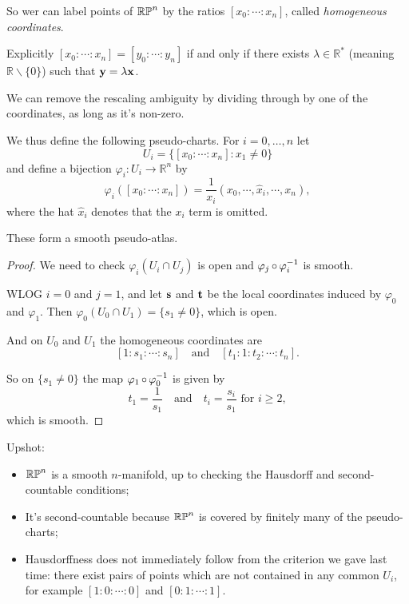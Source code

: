 \documentclass[a4paper,11pt]{article}
\begin{document}
	So wer can label points of $\mathbb{RP}^{n}$ by the ratios $[x_0 : \cdots : x_n]$, called \emph{homogeneous coordinates}.

	Explicitly $[x_0 : \cdots : x_n] = [y_0 : \cdots : y_n]$ if and only if there exists $\lambda \in \mathbb{R}^*$ (meaning $\mathbb{R} \backslash \{0\}$) such that $\vb y = \lambda \vb x$.

	We can remove the rescaling ambiguity by dividing through by one of the coordinates, as long as it's non-zero.

	We thus define the following pseudo-charts. For $i = 0, \dots, n$ let 
	\[
		U_i = \{[x_0 : \cdots : x_n] : x_1 \neq 0\}
	\]
	and define a bijection $\varphi_i : U_i \to \mathbb{R}^n$ by
	\[
		\varphi_i ([x_0 : \cdots : x_n]) = \frac{1}{x_i}(x_0, \cdots, \hat{x}_i, \cdots , x_n),
	\]
	where the hat $\hat{x}_i$ denotes that the $x_i$ term is omitted.

	\begin{lem}
		These form a smooth pseudo-atlas.
	\end{lem}
	\begin{proof}
		We need to check $\varphi_i ( U_i \cap U_j)$ is open and $\varphi_j \operatorname{\circ} \varphi_i ^{-1}$ is smooth.

		WLOG $i = 0$ and $j = 1$, and let $\vb s$ and $\vb t$ be the local coordinates induced by $\varphi_0$ and $\varphi_1$. Then $\varphi_0 (U_0 \cap U_1) = \{s_1 \neq 0\}$, which is open.

		And on $U_0$ and $U_1$ the homogeneous coordinates are
		\[
			[1 : s_1 : \cdots : s_n] \quad \text{and} \quad [t_1 : 1 : t_2 : \cdots : t_n].
		\]
		
		So on $\{s_1 \neq 0\}$ the map $\varphi_1 \operatorname{\circ} \varphi_0^{-1}$ is given by
		\[
			t_1 = \frac{1}{s_1} \quad \text{and} \quad t_i = \frac{s_i}{s_1} \text{ for } i \geq 2,
		\]
		which is smooth.
	\end{proof}

	Upshot:
	\begin{itemize}
		\item $\mathbb{RP}^{n}$ is a smooth $n$-manifold, up to checking the Hausdorff and second-countable conditions;
		\item It's second-countable because $\mathbb{RP}^{n}$ is covered by finitely many of the pseudo-charts;
		\item Hausdorffness does not immediately follow from the criterion we gave last time: there exist pairs of points which are not contained in any common $U_i$, for example $[1:0: \cdots : 0]$ and $[0: 1 : \cdots : 1]$.
	\end{itemize}
\end{document}
